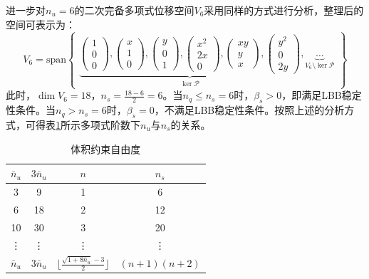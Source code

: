 进一步对$n_u=6$的二次完备多项式位移空间$V_6$采用同样的方式进行分析，整理后的空间可表示为：
\begin{equation}\label{ch_5:eq:base2}
    V_6 = \mathrm{span}
    \begin{Bmatrix}
        \underbrace{
        \begin{pmatrix} 1 \\ 0 \\ 0 \end{pmatrix},
        \begin{pmatrix} x \\ 1 \\ 0 \end{pmatrix},
        \begin{pmatrix} y \\ 0 \\ 1 \end{pmatrix},
        \begin{pmatrix} x^2 \\ 2x \\ 0 \end{pmatrix},
        \begin{pmatrix} xy \\ y \\ x \end{pmatrix},
        \begin{pmatrix} y^2 \\ 0 \\ 2y \end{pmatrix}
        }_{\ker \mathcal P}, 
        \underbrace{
            \dots
        }_{V_6\setminus \ker \mathcal P}
    \end{Bmatrix}
\end{equation}
此时，$\dim V_6 =18$，$n_s=\frac{18-6}{2}=6$。当$n_q\le n_s=6$时，$\beta_s>0$，即满足LBB稳定性条件。当$n_q>n_s=6$时，$\beta_s=0$，不满足LBB稳定性条件。按照上述的分析方式，可得表\ref{ch_5:tab:constraint}所示多项式阶数下$n_u$与$n_s$的关系。
\begin{table}[!h]
    \centering
    \caption{体积约束自由度}\label{ch_5:tab:constraint}
    \setlength{\tabcolsep}{10mm}
    \begin{tabular}{cccc}
        \toprule
            $\bar{n}_u$ & $3\bar{n}_u$ &$n$ &$ n_s$\\
        \midrule
        3  & 9  & 1 & 6 \\
        6  & 18 & 2 & 12 \\
        10 & 30 & 3 & 20 \\
        \vdots & \vdots & \vdots  & \vdots \\
        $\bar{n}_u$ & $3\bar{n}_u$ & $\lfloor\frac{\sqrt{1+8\bar{n}_u}-3}{2}\rfloor$ & $(n+1)(n+2)$ \\
        \bottomrule
    \end{tabular}
\end{table}

